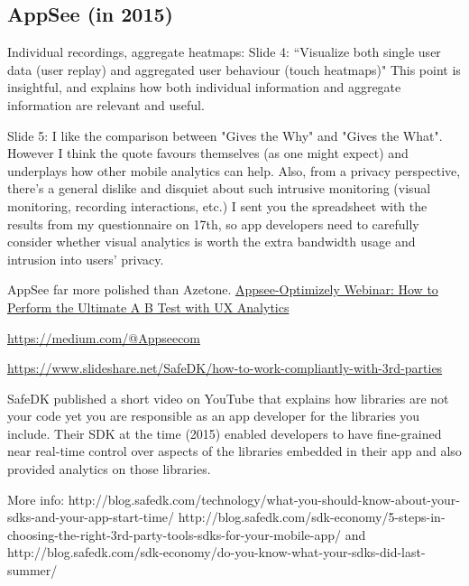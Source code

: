 \subsection{AppSee (in 2015)}
Individual recordings, aggregate heatmaps: Slide 4: ``Visualize both single user data (user replay) and aggregated user behaviour (touch heatmaps)" This point is insightful, and explains how both individual information and aggregate information are relevant and useful.

Slide 5: I like the comparison between "Gives the Why" and "Gives the What". However I think the quote favours themselves (as one might expect) and underplays how other mobile analytics can help. Also, from a privacy perspective, there's a general dislike and disquiet about such intrusive monitoring (visual monitoring, recording interactions, etc.) I sent you the spreadsheet with the results from my questionnaire on 17th, so app developers need to carefully consider whether visual analytics is worth the extra bandwidth usage and intrusion into users' privacy. 



AppSee far more polished than Azetone.
\href{https://youtu.be/GQ2DoINkba4?t=554}{Appsee-Optimizely Webinar: How to Perform the Ultimate A B Test with UX Analytics}

\url{https://medium.com/@Appseecom}

\url{https://www.slideshare.net/SafeDK/how-to-work-compliantly-with-3rd-parties}

SafeDK published a short video on YouTube that explains how libraries are not your code yet you are responsible as an app developer for the libraries you include. Their SDK at the time (2015) enabled developers to have fine-grained near real-time control over aspects of the libraries embedded in their app and also provided analytics on those libraries.

More info: 
http://blog.safedk.com/technology/what-you-should-know-about-your-sdks-and-your-app-start-time/
http://blog.safedk.com/sdk-economy/5-steps-in-choosing-the-right-3rd-party-tools-sdks-for-your-mobile-app/
and http://blog.safedk.com/sdk-economy/do-you-know-what-your-sdks-did-last-summer/



